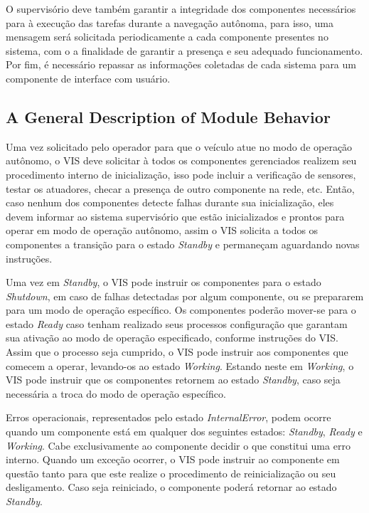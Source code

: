\documentclass[conference]{IEEEtran}
\begin{document}
O supervisório deve também garantir a integridade dos componentes necessários para à execução das tarefas durante a navegação autônoma, para isso, uma mensagem será solicitada periodicamente a cada componente presentes no sistema, com o a finalidade de garantir a presença e seu adequado funcionamento. Por fim, é necessário repassar as informações coletadas de cada sistema para um componente de interface com usuário.

%
\subsection{A General Description of Module Behavior}\label{subsec:module_behavior}

Uma vez solicitado pelo operador para que o veículo atue no modo de operação autônomo, o VIS deve solicitar à todos os componentes gerenciados realizem seu procedimento interno de inicialização, isso pode incluir a verificação de sensores, testar os atuadores, checar a presença de outro componente na rede, etc.
Então, caso nenhum dos componentes detecte falhas durante sua inicialização, eles devem informar ao sistema supervisório que estão inicializados e prontos para operar em modo de operação autônomo, assim o VIS solicita a todos os componentes a transição para o estado \textit{Standby} e permaneçam aguardando novas instruções. 

Uma vez em \textit{Standby}, o VIS pode instruir os componentes para o estado \textit{Shutdown}, em caso de falhas detectadas por algum componente, ou se prepararem para um modo de operação específico. Os componentes poderão mover-se para o estado \textit{Ready} caso tenham realizado seus processos configuração que garantam sua ativação ao modo de operação especificado, conforme instruções do VIS.  Assim que o processo seja cumprido, o VIS pode instruir aos componentes que comecem a operar, levando-os ao estado \textit{Working}. Estando neste em \textit{Working}, o VIS pode instruir que os componentes retornem ao estado \textit{Standby}, caso seja necessária a troca do modo de operação específico.

Erros operacionais, representados pelo estado \textit{InternalError}, podem ocorre quando um componente está em qualquer dos seguintes estados: \textit{Standby}, \textit{Ready} e \textit{Working}. Cabe exclusivamente ao componente decidir o que constitui uma erro interno. Quando um exceção ocorrer, o VIS pode instruir ao componente em questão tanto para que este realize o procedimento de reinicialização ou seu desligamento. Caso seja reiniciado, o componente poderá retornar ao estado \textit{Standby}.
\end{document}

